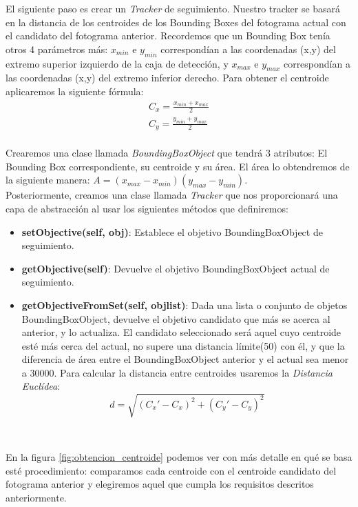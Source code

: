 El siguiente paso es crear un \textit{Tracker} de seguimiento. Nuestro tracker se basará en la distancia de los centroides de los Bounding Boxes del fotograma actual con el candidato del fotograma anterior. Recordemos que un Bounding Box tenía otros 4 parámetros más: $x_{min}$ e $y_{min}$ correspondían a las coordenadas (x,y) del extremo superior izquierdo de la caja de detección, y $x_{max}$ e $y_{max}$ correspondían a las coordenadas (x,y) del extremo inferior derecho. Para obtener el centroide aplicaremos la siguiente fórmula:\\
\begin{eqnarray*}
C_x = \frac{x_{min} + x_{max}}{2}\\
C_y = \frac{y_{min} + y_{max}}{2}\\
\end{eqnarray*}

Crearemos una clase llamada \textit{BoundingBoxObject} que tendrá 3 atributos: El Bounding Box correspondiente, su centroide y su área. El área lo obtendremos de la siguiente manera: $A = (x_{max} - x_{min}) (y_{max} - y_{min})$.\\

Posteriormente, creamos una clase llamada \textit{Tracker} que nos proporcionará una capa de abstracción al usar los siguientes métodos que definiremos:

\begin{itemize}
	\item \textbf{setObjective(self, obj)}: Establece el objetivo BoundingBoxObject de seguimiento.
	\item \textbf{getObjective(self)}: Devuelve el objetivo BoundingBoxObject actual de seguimiento.
	\item \textbf{getObjectiveFromSet(self, objlist)}: Dada una lista o conjunto de objetos BoundingBoxObject, devuelve el objetivo candidato que más se acerca al anterior, y lo actualiza. El candidato seleccionado será aquel cuyo centroide esté más cerca del actual, no supere una distancia límite(50) con él, y que la diferencia de área entre el BoundingBoxObject anterior y el actual sea menor a 30000. Para calcular la distancia entre centroides usaremos la \textit{Distancia Euclídea}:
	\begin{equation*}
	d = \sqrt{(C_{x}' - C_{x})^2 + (C_{y}' - C_{y})^2}
	\end{equation*}
\end{itemize}\

En la figura \ref{fig:obtencion_centroide} podemos ver con más detalle en qué se basa esté procedimiento: comparamos cada centroide con el centroide candidato del fotograma anterior y elegiremos aquel que cumpla los requisitos descritos anteriormente.\\

